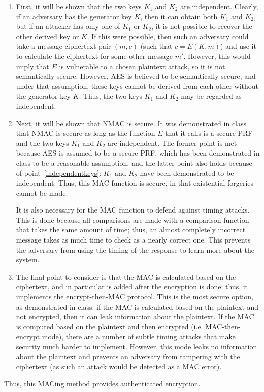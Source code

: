 \documentclass{amsart}
\begin{document}
\begin{enumerate}
\item\label{independentkeys} First, it will be shown that the two keys $K_1$ and $K_2$ are independent. Clearly, if an adversary has the generator key $K$, then it can obtain both $K_1$ and $K_2$, but if an attacker has only one of $K_1$ or $K_2$, it is not possible to recover the other derived key or $K$. If this were possible, then such an adversary could take a message-ciphertext pair $(m,c)$ (such that $c = E(K,m)$) and use it to calculate the ciphertext for some other message $m'$. However, this would imply that $E$ is vulnerable to a chosen plaintext attack, so it is not semantically secure. However, AES is believed to be semantically secure, and under that assumption, these keys cannot be derived from each other without the generator key $K$. Thus, the two keys $K_1$ and $K_2$ may be regarded as independent.
\item Next, it will be shown that NMAC is secure. It was demonstrated in class that NMAC is secure as long as the function $E$ that it calls is a secure PRF and the two keys $K_1$ and $K_2$ are independent. The former point is met because AES is assumed to be a secure PRF, which has been demonstrated in class to be a reasonable assumption, and the latter point also holds because of point~\ref{independentkeys}: $K_1$ and $K_2$ have been demonstrated to be independent. Thus, this MAC function is secure, in that existential forgeries cannot be made.

It is also necessary for the MAC function to defend against timing attacks. This is done because all comparisons are made with a comparison function that takes the same amount of time; thus, an almost completely incorrect message takes as much time to check as a nearly correct one. This prevents the adversary from using the timing of the response to learn more about the system.
\item The final point to consider is that the MAC is calculated based on the ciphertext, and in particular is added after the encryption is done; thus, it implements the encrypt-then-MAC protocol. This is the most secure option, as demonstrated in class: if the MAC is calculated based on the plaintext and not encrypted, then it can leak information about the plaintext. If the MAC is computed based on the plaintext and then encrypted (i.e. MAC-then-encrypt mode), there are a number of subtle timing attacks that make security much harder to implement. However, this mode leaks no information about the plaintext and prevents an adversary from tampering with the ciphertext (as such an attack would be detected as a MAC error).
\end{enumerate}
Thus, this MACing method provides authenticated encryption.
\end{document}
